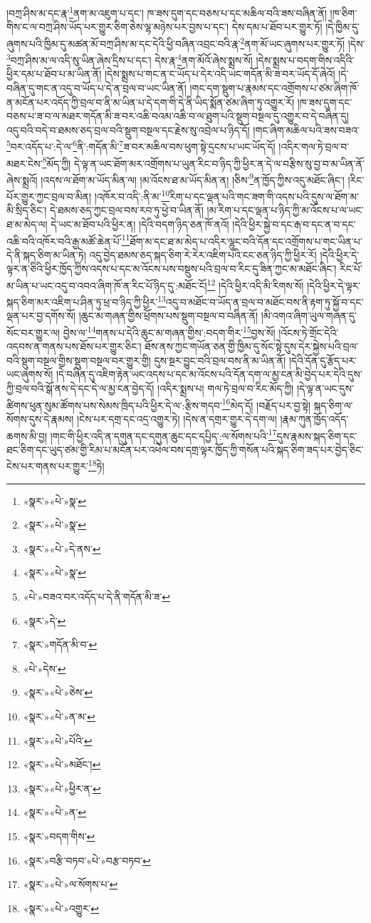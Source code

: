 །བཀྲ་ཤིས་མ་དང་རྣ་\footnote{«སྣར་»«པེ་»སྣ་}ནག་མ་འཇུག་པ་དང་། ཁ་ཟས་དུག་དང་བཅས་པ་དང་མཆིལ་བའི་ཟས་བཞིན་ནོ། །ཁ་ཅིག་གིས་ང་ལ་བཀྲ་ཤིས་ཡོད་པར་གྱུར་ཅིག་ཅེས་ལྷ་མཉེས་པར་བྱས་པ་དང་། དེས་དམ་པ་ཐོབ་པར་གྱུར་ཏོ། །དེ་ཁྱིམ་དུ་ཞུགས་པའི་ཁྱིམ་དུ་མཚན་མོ་བཀྲ་ཤིས་མ་དང་དེའི་ཕྱི་བཞིན་འབྲང་བའི་རྣ་\footnote{«སྣར་»«པེ་»སྣ་}ནག་མོ་ཡང་ཞུགས་པར་གྱུར་ཏོ། །དེས་\footnote{«སྣར་»«པེ་»དེ་ནས་}བཀྲ་ཤིས་མ་ལ་འདི་སུ་ཡིན་ཞེས་དྲིས་པ་དང་། དེས་རྣ་\footnote{«སྣར་»«པེ་»སྣ་}ནག་མོའོ་ཞེས་སྨྲས་སོ། །དེས་སྨྲས་པ་བདག་གིས་འདིའི་ཕྱིར་དམ་པ་ཐོབ་པ་མ་ཡིན་ནོ། །དེས་སྨྲས་པ་གང་ན་ང་ཡོད་པ་དེར་འདི་ཡང་གདོན་མི་ཟ་བར་ཡོད་དོ་ཞེའོ། །དེ་བཞིན་དུ་གང་ན་འདུ་བ་ཡོད་པ་དེ་ན་བྲལ་བ་ཡང་ཡིན་ནོ། །གང་དག་སྡུག་པ་རྣམས་དང་འགྲོགས་པ་ཙམ་ཞིག་ཁོ་ན་མངོན་པར་འདོད་ཀྱི་བྲལ་བ་ནི་མ་ཡིན་པ་དེ་དག་གི་དེ་ནི་ཡིད་སྨོན་ཙམ་ཞིག་ཏུ་འགྱུར་རོ། །ཁ་ཟས་དུག་དང་བཅས་པ་ཟ་བ་ལ་མཐར་གདོན་མི་ཟ་བར་འཆི་བའམ་འཆི་བ་ལ་ཐུག་པའི་སྡུག་བསྔལ་དུ་འགྱུར་བ་དེ་བཞིན་དུ། འདུ་བའི་བདེ་བ་ཐམས་ཅད་བྲལ་བའི་སྡུག་བསྔལ་དང་རྗེས་སུ་འབྲེལ་པ་ཉིད་དོ། །གང་ཞིག་མཆིལ་པའི་ཟས་བཟའ་\footnote{«པེ་»བཟའ་བར་འདོད་པ་དེ་ནི་གདོན་མི་ཟ་}བར་འདོད་པ་:དེ་ལ་\footnote{«སྣར་»དེ་}ནི་:གདོན་མི་\footnote{«སྣར་»གདོན་མི་བ་}ཟ་བར་མཆིལ་བས་ཕུག་སྟེ་དྲངས་པ་ཡང་ཡོད་དོ། །འདིར་གལ་ཏེ་བྲལ་བ་མཐར་ངེས་\footnote{«པེ་»དེས་}མོད་ཀྱི། དེ་ལྟ་ན་ཡང་ཐོག་མར་འགྲོགས་པ་ཡུན་རིང་བ་ཉིད་ཀྱི་ཕྱིར་ན་དེ་ལ་བརྩིས་སུ་བྱ་བ་མ་ཡིན་ནོ་ཞེས་སྨྲའོ། །འདས་ལ་ཐོག་མ་ཡོད་མིན་ལ། །མ་འོངས་ཐ་མ་ཡོད་མིན་ན། །ཅིས་\footnote{«སྣར་»«པེ་»ཅེས་}ན་ཁྱོད་ཀྱིས་འདུ་མཐོང་ཞིང་། །རིང་པོར་གྱུར་ཀྱང་བྲལ་བ་མིན། །འཁོར་བ་འདི་:ནི་མ་\footnote{«སྣར་»«པེ་»ན་མ་}རིག་པ་དང་ལྡན་པའི་གང་ཟག་གི་འདས་པའི་དུས་ལ་ཐོག་མ་མི་སྲིད་ཅིང་། དེ་ཐམས་ཅད་ཀྱང་བྲལ་བས་རབ་ཏུ་ཕྱེ་བ་ཡིན་ནོ། །མ་རིག་པ་དང་ལྡན་པ་ཉིད་ཀྱི་མ་འོངས་པ་ལ་ཡང་ཐ་མ་མེད་ལ། དེ་ཡང་མ་ཐོབ་པའི་ཕྱིར་ན། །དེའི་བདག་ཉིད་ཅན་ཁོ་ནའོ། །དེའི་ཕྱིར་སྐྱེ་བ་དང་རྒ་བ་དང་ན་བ་དང་འཆི་བའི་འཁོར་བའི་རྒྱ་མཚོ་ཆེན་པོ་\footnote{«སྣར་»«པེ་»པོའི་}ཐོག་མ་དང་ཐ་མ་མེད་པ་འདིར་ལྷུང་བའི་དོན་དང་འགྲོགས་པ་གང་ཡིན་པ་དེ་ནི་སྐད་ཅིག་མ་ཡིན་ཏེ། འདུ་བྱེད་ཐམས་ཅད་སྐད་ཅིག་རེ་རེར་འཇིག་པའི་ངང་ཅན་ཉིད་ཀྱི་ཕྱིར་རོ། །དེའི་ཕྱིར་དེ་ལྟར་ན་ཅིའི་ཕྱིར་ཁྱོད་ཀྱིས་འདས་པ་དང་མ་འོངས་པས་བསྡུས་པའི་བྲལ་བ་རིང་དུ་ཟིན་ཀྱང་མ་མཐོང་ཞིང་། རིང་པོ་མ་ཡིན་པ་ཡང་འདུ་བ་འབའ་ཞིག་ཁོ་ན་རིང་པོ་ཉིད་དུ་:མཐོང་ངོ།\footnote{«སྣར་»«པེ་»མཐོང་།} །དེའི་ཕྱིར་འདི་མི་རིགས་སོ། །དེའི་ཕྱིར་དེ་ལྟར་སྐད་ཅིག་མར་འཇིག་པ་ཤིན་ཏུ་ཕྲ་བ་ཉིད་ཀྱི་ཕྱིར་\footnote{«སྣར་»«པེ་»ཕྱིར་ན་}འདུ་བ་མཐོང་བ་ཡོད་ན་བྲལ་བ་མཐོང་བས་ནི་རྟག་ཏུ་སྐྱོ་བ་དང་ལྡན་པར་བྱ་དགོས་སོ། །ཆུང་མ་གཞན་གྱིས་ཕྲོགས་པས་སྡུག་བསྔལ་བ་བཞིན་ནོ། །མི་འགའ་ཞིག་ཡུལ་གཞན་དུ་སོང་བར་གྱུར་ལ། བྱེས་ལ་\footnote{«སྣར་»«པེ་»ན་}གནས་པ་དེའི་ཆུང་མ་གཞན་གྱིས་:བདག་གིར་\footnote{«སྣར་»བདག་གིས་}བྱས་སོ། །འོངས་ཏེ་གྲོང་དེའི་འདབས་ན་གནས་པས་ཐོས་པར་གྱུར་ཅིང་། ཐོས་ནས་ཀྱང་གཡོན་ཅན་གྱི་ཁྱིམ་དུ་སོང་སྟེ་དུས་དེར་སྐྱེས་པའི་བྲལ་བའི་སྡུག་བསྔལ་གྱིས་སྡུག་བསྔལ་བར་གྱུར་གྱི། དུས་སྔར་བྱུང་བའི་བྲལ་བས་ནི་མ་ཡིན་ནོ། །དེའི་དོན་དུ་རྩོད་པར་ཡང་ཞུགས་སོ། །དེ་བཞིན་དུ་འཇིག་རྟེན་ཡང་འདས་པ་དང་མ་འོངས་པའི་དོན་དག་ལ་མྱ་ངན་མི་བྱེད་པར་དེའི་དུས་ཀྱི་བྲལ་བའི་སྒོ་ནས་དེ་དང་དེ་ལ་མྱ་ངན་བྱེད་དོ། །འདིར་སྨྲས་པ། གལ་ཏེ་བྲལ་བ་རིང་མོད་ཀྱི། །དེ་ལྟ་ན་ཡང་དུས་ཚིགས་ཕུན་སུམ་ཚོགས་པས་སེམས་ཁྲིད་པའི་ཕྱིར་དེ་ལ་:རྩིས་གདབ་\footnote{«སྣར་»བརྩི་བཏབ་«པེ་»བརྩ་བཏབ་}མེད་དོ། །བརྗོད་པར་བྱ་སྟེ། སྐད་ཅིག་ལ་སོགས་དུས་དེ་རྣམས། །ངེས་པར་དགྲ་དང་འདྲ་འགྱུར་ཏེ། །དེས་ན་དགྲར་གྱུར་དེ་དག་ལ། །རྣམ་ཀུན་ཁྱོད་འདོད་ཆགས་མི་བྱ། །གང་གི་ཕྱིར་འདི་ན་དགུན་དང་དགུན་ཆུང་དང་དཔྱིད་:ལ་སོགས་པའི་\footnote{«སྣར་»«པེ་»ལ་སོགས་པ་}དུས་རྣམས་སྐད་ཅིག་དང་ཐང་ཅིག་དང་ཡུད་ཙམ་གྱི་རིམ་པ་མངོན་པར་འཕེལ་བས་དགྲ་ལྟར་ཁྱོད་ཀྱི་གསོན་པའི་སྐད་ཅིག་ཟད་པར་བྱེད་ཅིང་ངེས་པར་གནས་པར་གྱུར་\footnote{«སྣར་»«པེ་»འགྱུར་}ཏེ། 